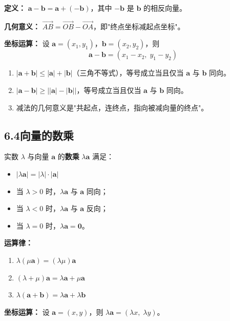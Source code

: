 \documentclass[12pt, a4paper]{ctexart}
\begin{document}
\begin{knowledgebox}[向量减法]
\textbf{定义：} $\boldsymbol{a}-\boldsymbol{b}=\boldsymbol{a}+(-\boldsymbol{b})$，其中 $-\boldsymbol{b}$ 是 $\boldsymbol{b}$ 的相反向量。

\textbf{几何意义：} $\overrightarrow{AB}=\overrightarrow{OB}-\overrightarrow{OA}$，即"终点坐标减起点坐标"。

\textbf{坐标运算：} 设 $\boldsymbol{a}=(x_1,y_1)$，$\boldsymbol{b}=(x_2,y_2)$，则
\[
\boldsymbol{a}-\boldsymbol{b}=(x_1-x_2,\; y_1-y_2)
\]
\end{knowledgebox}

\begin{warnbox}[易错提醒]
\begin{enumerate}[leftmargin=2em]
  \item $|\boldsymbol{a}+\boldsymbol{b}|\leqslant|\boldsymbol{a}|+|\boldsymbol{b}|$（三角不等式），等号成立当且仅当 $\boldsymbol{a}$ 与 $\boldsymbol{b}$ 同向。
  \item $|\boldsymbol{a}-\boldsymbol{b}|\geqslant\bigl||\boldsymbol{a}|-|\boldsymbol{b}|\bigr|$，等号成立当且仅当 $\boldsymbol{a}$ 与 $\boldsymbol{b}$ 同向。
  \item 减法的几何意义是"共起点，连终点，指向被减向量的终点"。
\end{enumerate}
\end{warnbox}

\subsection*{6.4\quad 向量的数乘}

\begin{knowledgebox}[数乘的定义与运算律]
实数 $\lambda$ 与向量 $\boldsymbol{a}$ 的\textbf{数乘} $\lambda\boldsymbol{a}$ 满足：
\begin{itemize}[leftmargin=2em]
  \item $|\lambda\boldsymbol{a}|=|\lambda|\cdot|\boldsymbol{a}|$
  \item 当 $\lambda>0$ 时，$\lambda\boldsymbol{a}$ 与 $\boldsymbol{a}$ 同向；
  \item 当 $\lambda<0$ 时，$\lambda\boldsymbol{a}$ 与 $\boldsymbol{a}$ 反向；
  \item 当 $\lambda=0$ 时，$\lambda\boldsymbol{a}=\boldsymbol{0}$。
\end{itemize}

\textbf{运算律：}
\begin{enumerate}[leftmargin=2em]
  \item $\lambda(\mu\boldsymbol{a})=(\lambda\mu)\boldsymbol{a}$
  \item $(\lambda+\mu)\boldsymbol{a}=\lambda\boldsymbol{a}+\mu\boldsymbol{a}$
  \item $\lambda(\boldsymbol{a}+\boldsymbol{b})=\lambda\boldsymbol{a}+\lambda\boldsymbol{b}$
\end{enumerate}

\textbf{坐标运算：} 设 $\boldsymbol{a}=(x,y)$，则 $\lambda\boldsymbol{a}=(\lambda x,\;\lambda y)$。
\end{knowledgebox}
\end{document}

